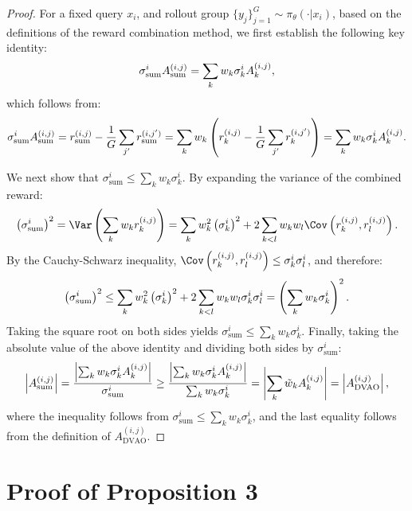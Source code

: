 \begin{proof}
    For a fixed query $x_i$, and rollout group $\{y_j\}_{j=1}^G \sim \pi_\theta (\cdot | x_i)$, based on the definitions of the reward combination method, we first establish the following key identity:
    \begin{align}
        \sigma_\text{sum}^i A_\text{sum}^{(i,j)} = \sum_k w_k \sigma_k^i A_k^{(i,j)},\notag
    \end{align}
    which follows from:
    \begin{align}
        \sigma_\text{sum}^i A_\text{sum}^{(i,j)} = r_\text{sum}^{(i,j)} - \frac{1}{G} \sum_{j'}r_\text{sum}^{(i,j')} = \sum_k w_k \left( r_k^{(i,j)} - \frac{1}{G}\sum_{j'}r_k^{(i,j')} \right) = \sum_k w_k \sigma_k^i A_k^{(i,j)}.\notag
    \end{align}
    
    We next show that $\sigma_\text{sum}^i \le \sum_k w_k \sigma_k^i$. By expanding the variance of the combined reward:
    \begin{align}
        \left(\sigma_\text{sum}^i\right)^2 = \Var\left( \sum_k w_k r_k^{(i,j)} \right) = \sum_k w_k^2 \left(\sigma_k^i\right)^2 + 2 \sum_{k < l} w_k w_l \Cov\left(r_k^{(i,j)}, r_l^{(i,j)}\right).\notag
    \end{align}
    By the Cauchy-Schwarz inequality, $\Cov\left(r_k^{(i,j)}, r_l^{(i,j)}\right) \le \sigma_k^i \sigma_l^i$, and therefore:
    \begin{align}
        \left(\sigma_\text{sum}^i\right)^2 \le \sum_k w_k^2 \left(\sigma_k^i\right)^2 + 2\sum_{k < l} w_k w_l \sigma_k^i \sigma_l^i = \left(\sum_k w_k \sigma_k^i\right)^2.\notag
    \end{align}
    Taking the square root on both sides yields $\sigma_\text{sum}^i \le \sum_k w_k \sigma_k^i$. Finally, taking the absolute value of the above identity and dividing both sides by $\sigma_\text{sum}^i$:
    \begin{align}
        \left|A_\text{sum}^{(i,j)}\right| = \frac{\left|\sum_k w_k \sigma_k^i A_k^{(i,j)}\right|}{\sigma_\text{sum}^i} \ge \frac{\left|\sum_k w_k \sigma_k^i A_k^{(i,j)}\right|}{\sum_kw_k \sigma_k^i} = \left|\sum_k \tilde{w}_k A_k^{(i,j)}\right| = \left|A_\text{DVAO}^{(i,j)}\right|,\notag
    \end{align}
    where the inequality follows from $\sigma_\text{sum}^i \le \sum_k w_k \sigma_k^i$, and the last equality follows from the definition of $A_\text{DVAO}^{(i,j)}$.
\end{proof}

\section{Proof of Proposition 3}
\label{appendix:proof_of_proposition_3}

